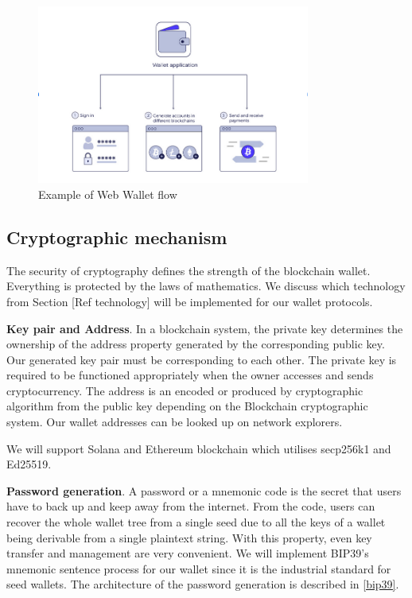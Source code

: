 \begin{figure}[!ht]
    \centering
    \includegraphics[width=0.8\textwidth]{images/webwallet.png}
    \caption[Example of Web Wallet flow]{Example of Web Wallet flow}
    \label{fig:webwallet}
\end{figure}

\subsection{Cryptographic mechanism}
The security of cryptography defines the strength of the blockchain wallet. Everything is protected by the laws of mathematics. We discuss which technology from Section [Ref technology] will be implemented for our wallet protocols.

\bigskip
{\textbf{Key pair and Address}}. In a blockchain system, the private key determines the ownership of the address property generated by the corresponding public key. Our generated key pair must be corresponding to each other. The private key is required to be functioned appropriately when the owner accesses and sends cryptocurrency. The address is an encoded or produced by cryptographic algorithm from the public key depending on the Blockchain cryptographic system. Our wallet addresses can be looked up on network explorers.

We will support Solana and Ethereum blockchain which utilises secp256k1 and Ed25519.

\bigskip
{\textbf{Password generation}}. A password or a mnemonic code is the secret that users have to back up and keep away from the internet. From the code, users can recover the whole wallet tree from a single seed due to all the keys of a wallet being derivable from a single plaintext string. With this property, even key transfer and management are very convenient. We will implement BIP39's mnemonic sentence process for our wallet since it is the industrial standard for seed wallets.
The architecture of the password generation is described in \autoref{bip39}.

